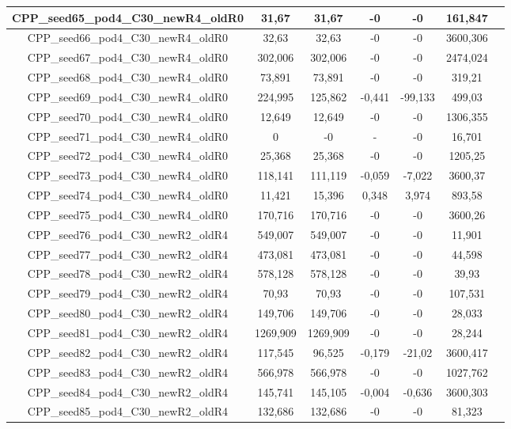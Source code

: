 \documentclass[a4paper]{article}
\begin{document}
\begin{center}
\begin{longtable}{ccccccc}
\hline
CPP\_seed65\_pod4\_C30\_newR4\_oldR0 & 31,67 & 31,67 & -0 & -0 & 161,847\\
\hline
CPP\_seed66\_pod4\_C30\_newR4\_oldR0 & 32,63 & 32,63 & -0 & -0 & 3600,306\\
\hline
CPP\_seed67\_pod4\_C30\_newR4\_oldR0 & 302,006 & 302,006 & -0 & -0 & 2474,024\\
\hline
CPP\_seed68\_pod4\_C30\_newR4\_oldR0 & 73,891 & 73,891 & -0 & -0 & 319,21\\
\hline
CPP\_seed69\_pod4\_C30\_newR4\_oldR0 & 224,995 & 125,862 & -0,441 & -99,133 & 499,03\\
\hline
CPP\_seed70\_pod4\_C30\_newR4\_oldR0 & 12,649 & 12,649 & -0 & -0 & 1306,355\\
\hline
CPP\_seed71\_pod4\_C30\_newR4\_oldR0 & 0 & -0 & - & -0 & 16,701\\
\hline
CPP\_seed72\_pod4\_C30\_newR4\_oldR0 & 25,368 & 25,368 & -0 & -0 & 1205,25\\
\hline
CPP\_seed73\_pod4\_C30\_newR4\_oldR0 & 118,141 & 111,119 & -0,059 & -7,022 & 3600,37\\
\hline
CPP\_seed74\_pod4\_C30\_newR4\_oldR0 & 11,421 & 15,396 & 0,348 & 3,974 & 893,58\\
\hline
CPP\_seed75\_pod4\_C30\_newR4\_oldR0 & 170,716 & 170,716 & -0 & -0 & 3600,26\\
\hline
CPP\_seed76\_pod4\_C30\_newR2\_oldR4 & 549,007 & 549,007 & -0 & -0 & 11,901\\
\hline
CPP\_seed77\_pod4\_C30\_newR2\_oldR4 & 473,081 & 473,081 & -0 & -0 & 44,598\\
\hline
CPP\_seed78\_pod4\_C30\_newR2\_oldR4 & 578,128 & 578,128 & -0 & -0 & 39,93\\
\hline
CPP\_seed79\_pod4\_C30\_newR2\_oldR4 & 70,93 & 70,93 & -0 & -0 & 107,531\\
\hline
CPP\_seed80\_pod4\_C30\_newR2\_oldR4 & 149,706 & 149,706 & -0 & -0 & 28,033\\
\hline
CPP\_seed81\_pod4\_C30\_newR2\_oldR4 & 1269,909 & 1269,909 & -0 & -0 & 28,244\\
\hline
CPP\_seed82\_pod4\_C30\_newR2\_oldR4 & 117,545 & 96,525 & -0,179 & -21,02 & 3600,417\\
\hline
CPP\_seed83\_pod4\_C30\_newR2\_oldR4 & 566,978 & 566,978 & -0 & -0 & 1027,762\\
\hline
CPP\_seed84\_pod4\_C30\_newR2\_oldR4 & 145,741 & 145,105 & -0,004 & -0,636 & 3600,303\\
\hline
CPP\_seed85\_pod4\_C30\_newR2\_oldR4 & 132,686 & 132,686 & -0 & -0 & 81,323\\

\end{longtable}
\end{center}
\end{document}
